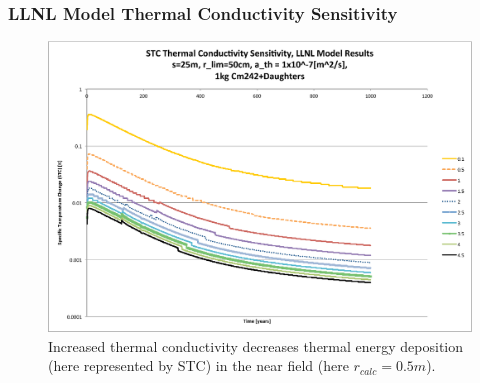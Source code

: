 

\begin{frame}[ctb!]
\frametitle{LLNL Model Thermal Conductivity Sensitivity}

\begin{figure}[htbp!]
\begin{center}
\includegraphics[height=0.7\textheight]{./thermal_demonstration/conductivity/Cm242kth_alpha_low.eps}
\end{center}
\caption[$K_{th}$ Sensitivity for Low $\alpha_{th}$ in LLNL Model]{Increased thermal conductivity decreases thermal energy deposition 
(here represented by STC) in the near field (here $r_{calc} = 0.5m$).}
\label{fig:Cm242Kth_alpha_low}
\end{figure}

\end{frame}


